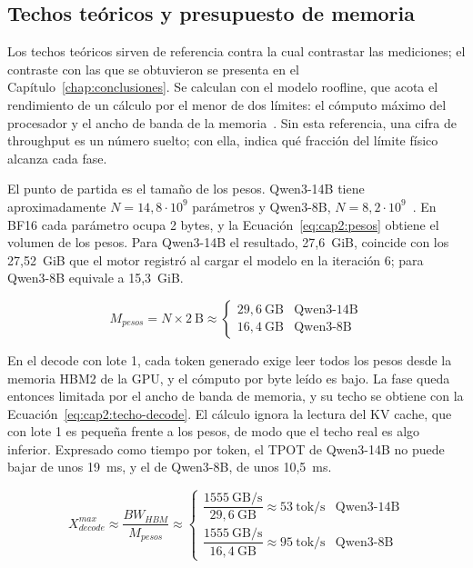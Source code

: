 \subsection{Techos teóricos y presupuesto de memoria}
\label{sec:cap2:techos}

Los techos teóricos sirven de referencia contra la cual contrastar las mediciones; el contraste con las que se obtuvieron se presenta en el Capítulo~\ref{chap:conclusiones}. Se calculan con el modelo roofline, que acota el rendimiento de un cálculo por el menor de dos límites: el cómputo máximo del procesador y el ancho de banda de la memoria~\cite{williams2009roofline}. Sin esta referencia, una cifra de throughput es un número suelto; con ella, indica qué fracción del límite físico alcanza cada fase.

El punto de partida es el tamaño de los pesos. Qwen3-14B tiene aproximadamente $N = 14{,}8 \cdot 10^{9}$ parámetros y Qwen3-8B, $N = 8{,}2 \cdot 10^{9}$~\cite{qwen2025qwen3}. En BF16 cada parámetro ocupa 2 bytes, y la Ecuación~\ref{eq:cap2:pesos} obtiene el volumen de los pesos. Para Qwen3-14B el resultado, 27,6~GiB, coincide con los 27,52~GiB que el motor registró al cargar el modelo en la iteración 6; para Qwen3-8B equivale a 15,3~GiB.

\begin{equation}
\label{eq:cap2:pesos}
M_{pesos} = N \times 2~\mathrm{B} \approx
\begin{cases}
29{,}6~\mathrm{GB} & \text{Qwen3-14B} \\
16{,}4~\mathrm{GB} & \text{Qwen3-8B}
\end{cases}
\end{equation}

En el decode con lote 1, cada token generado exige leer todos los pesos desde la memoria HBM2 de la GPU, y el cómputo por byte leído es bajo. La fase queda entonces limitada por el ancho de banda de memoria, y su techo se obtiene con la Ecuación~\ref{eq:cap2:techo-decode}. El cálculo ignora la lectura del KV cache, que con lote 1 es pequeña frente a los pesos, de modo que el techo real es algo inferior. Expresado como tiempo por token, el TPOT de Qwen3-14B no puede bajar de unos 19~ms, y el de Qwen3-8B, de unos 10,5~ms.

\begin{equation}
\label{eq:cap2:techo-decode}
X_{decode}^{max} \approx \frac{BW_{HBM}}{M_{pesos}} \approx
\begin{cases}
\dfrac{1555~\mathrm{GB/s}}{29{,}6~\mathrm{GB}} \approx 53~\mathrm{tok/s} & \text{Qwen3-14B} \\[10pt]
\dfrac{1555~\mathrm{GB/s}}{16{,}4~\mathrm{GB}} \approx 95~\mathrm{tok/s} & \text{Qwen3-8B}
\end{cases}
\end{equation}

